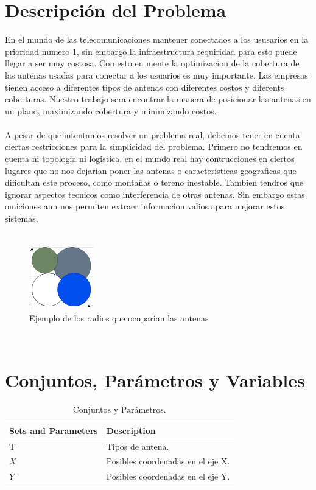 \documentclass[runningheads]{llncs}
\begin{document}
\section{Descripci\'{o}n del Problema}
En el mundo de las telecomunicaciones mantener conectados a los ususarios en la prioridad numero 1, sin embargo la infraestructura requiridad para esto puede llegar a ser muy costosa. Con esto en mente la optimizacion de la cobertura de las antenas usadas para conectar a los usuarios es muy importante. Las empresas tienen acceso a diferentes tipos de antenas con diferentes costos y diferents coberturas. Nuestro trabajo sera encontrar la manera de posicionar las antenas en un plano, maximizando cobertura y minimizando costos.
\\ \\
A pesar de que intentamos resolver un problema real, debemos tener en cuenta ciertas restricciones para la simplicidad del problema. Primero no tendremos en cuenta ni topologia ni logistica, en el mundo real hay contrucciones en ciertos lugares que no nos dejarian poner las antenas o caracteristicas geograficas que dificultan este proceso, como montañas o tereno inestable. Tambien tendros que ignorar aspectos tecnicos como interferencia de otras antenas. Sin embargo estas omiciones aun nos permiten extraer informacion valiosa para mejorar estos sistemas.
\\ \\
\begin{figure}
	\centering
	\includegraphics[width=0.25\textwidth]{plot3.png}
	\caption{Ejemplo de los radios que ocuparian las antenas}
	\label{fig:your-image}
\end{figure}
\\






\section{Conjuntos, Par\'{a}metros y Variables}

\begin{table}[h]
	\caption{Conjuntos y Par\'{a}metros. \label{Tab: tab1}}
	\begin{tabular*}{\hsize}{@{\extracolsep{\fill}}ll@{}}
		\hline
		\textbf{Sets and Parameters} & \textbf{Description}\\
		\hline
		T & Tipos de antena.\\
		$X$  & Posibles coordenadas en el eje X.\\
		$Y$  & Posibles coordenadas en el eje Y.\\
		\hline
	\end{tabular*}
\end{table}
\end{document}
